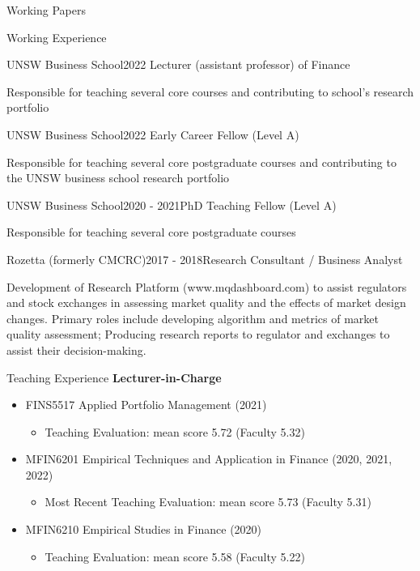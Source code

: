 \documentclass{resume} %
\begin{document}
\begin{rSection}{Working Papers}
	\begin{rSection}{Working Experience}

		\begin{rSubsection}{UNSW Business School}{2022 \- }{Lecturer (assistant professor) of Finance}{}
			\item Responsible for teaching several core courses and contributing to school's research portfolio
		\end{rSubsection}
		\begin{rSubsection}{UNSW Business School}{2022 }{Early Career Fellow (Level A)}{}
			\item Responsible for teaching several core postgraduate courses and contributing to the UNSW business school research portfolio
		\end{rSubsection}
		\begin{rSubsection}{UNSW Business School}{2020 - 2021}{PhD Teaching Fellow (Level A)}{}
			\item Responsible for teaching several core postgraduate courses
		\end{rSubsection}
		\begin{rSubsection}{Rozetta (formerly CMCRC)}{2017 - 2018}{Research Consultant / Business Analyst}{}
			\item Development of Research Platform (www.mqdashboard.com) to assist regulators and stock exchanges in assessing market quality and the effects of market design changes. Primary roles include developing algorithm and metrics of market quality assessment; Producing research reports to regulator and exchanges to assist their decision-making.
		\end{rSubsection}
	\end{rSection}

\end{rSection}
\begin{rSection}{Teaching Experience}
	\textbf{Lecturer-in-Charge}
	\begin{itemize}
		\item FINS5517 Applied Portfolio Management (2021)
		      \begin{itemize}
			      \item Teaching Evaluation: mean score 5.72 (Faculty 5.32)
		      \end{itemize}
		\item MFIN6201 Empirical Techniques and Application in Finance (2020, 2021, 2022)
		      \begin{itemize}
			      \item Most Recent Teaching Evaluation: mean score 5.73 (Faculty 5.31)
		      \end{itemize}
		\item MFIN6210 Empirical Studies in Finance (2020)
		      \begin{itemize}
			      \item Teaching Evaluation: mean score 5.58 (Faculty 5.22)
		      \end{itemize}
	\end{itemize}
\end{rSection}
\end{document}
